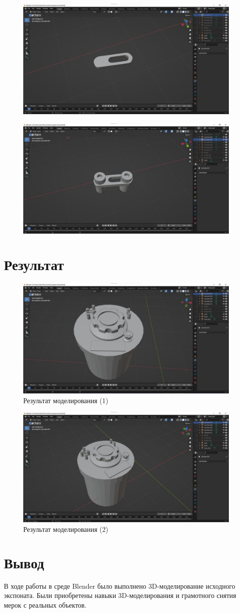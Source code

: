 \documentclass[a4paper,12pt]{article}
\begin{document}
    \begin{figure}[H]
        \centering
        \includegraphics[width=0.7\linewidth]{ph9}
    \end{figure}
    \begin{figure}[H]
        \centering
        \includegraphics[width=0.7\linewidth]{ph10}
    \end{figure}

    \section{Результат}
    \begin{figure}[H]
        \centering
        \includegraphics[width=0.7\linewidth]{ph11}
        \caption{Результат моделирования (1)}
    \end{figure}
    \begin{figure}[H]
        \centering
        \includegraphics[width=0.7\linewidth]{ph12}
        \caption{Результат моделирования (2)}
    \end{figure}

    \section{Вывод}
    В ходе работы в среде Blender было выполнено 3D-моделирование исходного экспоната. Были приобретены
    навыки 3D-моделирования и грамотного снятия мерок с реальных объектов.
\end{document}
